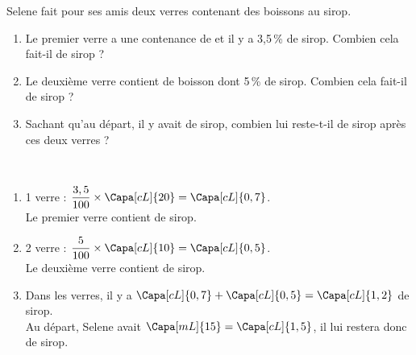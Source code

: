 \begin{exercice*} %
   Selene fait pour ses amis deux verres contenant des boissons au sirop.
      \begin{enumerate}
         \item Le premier verre a une contenance de  et il y a 3,5\,\% de sirop. Combien cela fait-il de sirop ?
         \item Le deuxième verre contient  de boisson dont 5\,\% de sirop. Combien cela fait-il de sirop ?
         \item Sachant qu'au départ, il y avait  de sirop, combien lui reste-t-il de sirop après ces deux verres ?
      \end{enumerate}
\end{exercice*}
   
\begin{corrige}
\ \\ [-5mm]
   \begin{enumerate}
      \item 1 verre : $\dfrac{3,5}{100}\times\Capa[cL]{20} =\Capa[cL]{0,7}$. \\ [1mm]
         {\red Le premier verre contient  de sirop}. \smallskip
      \item 2 verre : $\dfrac{5}{100}\times\Capa[cL]{10} =\Capa[cL]{0,5}$. \\ [1mm]
         {\red Le deuxième verre contient  de sirop}.
      \item Dans les verres, il y a $\Capa[cL]{0,7}+\Capa[cL]{0,5} =\Capa[cL]{1,2}$ de sirop. \\
         Au départ, Selene avait $\Capa[mL]{15} = \Capa[cL]{1,5}$, {\red il lui restera donc  de sirop}.
   \end{enumerate}
\end{corrige}

